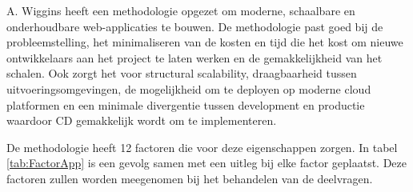 A. Wiggins \parencite{12Factor} heeft een methodologie opgezet om moderne, schaalbare en onderhoudbare web-applicaties te bouwen. De methodologie past goed bij de probleemstelling, het minimaliseren van de kosten en tijd die het kost om nieuwe ontwikkelaars aan het project te laten werken en de gemakkelijkheid van het schalen. Ook zorgt het voor structural scalability, draagbaarheid tussen uitvoeringsomgevingen, de mogelijkheid om te deployen op moderne cloud platformen en een minimale divergentie tussen development en productie waardoor CD gemakkelijk wordt om te implementeren.

De methodologie heeft 12 factoren die voor deze eigenschappen zorgen. In tabel \ref{tab:FactorApp} is een gevolg samen met een uitleg bij elke factor geplaatst. Deze factoren zullen worden meegenomen bij het behandelen van de deelvragen.

